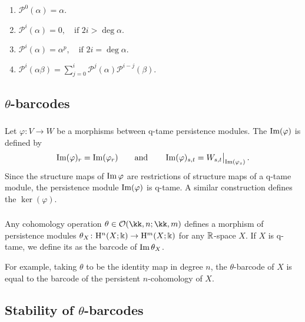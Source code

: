 \begin{enumerate}
	\item \(\mathcal{P}^0(\alpha) = \alpha.\)
	\item \(\mathcal{P}^i(\alpha) = 0, \quad \text{if } 2i > \deg\alpha.\)
	\item \(\mathcal{P}^i(\alpha) = \alpha^p, \quad \text{if } 2i = \deg\alpha.\)
	\item \(\mathcal{P}^i(\alpha \beta) = \textstyle\sum_{j=0}^{i} \mathcal{P}^j(\alpha) \mathcal{P}^{i-j}(\beta).\)
\end{enumerate}

\subsection{$\theta$-barcodes}

\subsubsection{} Let $\varphi \colon V \to W$ be a morphisms between q-tame persistence modules.
The  $\operatorname{Im}(\varphi)$ is defined by
\[
\operatorname{Im}(\varphi)_r = \operatorname{Im}(\varphi_r)
\qquad\text{and}\qquad
\operatorname{Im}(\varphi)_{s,t} = W_{s,t}\big|_{\operatorname{Im}(\varphi_s)}\,.
\]
Since the structure maps of $\operatorname{Im} \varphi$ are restrictions of structure maps of a q-tame module, the persistence module $\operatorname{Im}(\varphi)$ is q-tame.
A similar construction defines the  $\ker(\varphi)$.

\subsubsection{} \label{subsubsec:theta-barcodes}
Any cohomology operation $\theta \in \cO(\kk,n; \kk,m)$ defines a morphism of persistence modules $\theta_X \colon \mathrm{H}^n(X; \Bbbk) \to \mathrm{H}^m(X; \Bbbk)$ for any $\mathbb{R}$-space $X$.
If $X$ is q-tame, we define its  as the barcode of $\operatorname{Im}\theta_X$.

For example, taking $\theta$ to be the identity map in degree $n$, the $\theta$-barcode of $X$ is equal to the barcode of the persistent $n$-cohomology of $X$.


\subsection{Stability of $\theta$-barcodes}\label{ss:stability}


